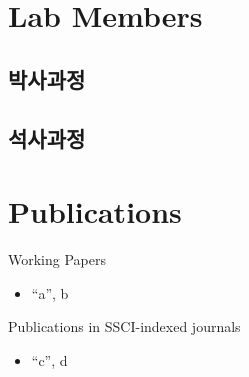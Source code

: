 \documentclass[
]{book}
\providecommand{\tightlist}{%
  \setlength{\itemsep}{0pt}\setlength{\parskip}{0pt}}
\begin{document}
\hypertarget{lab-members}{%
\chapter{Lab Members}\label{lab-members}}

\hypertarget{uxbc15uxc0acuxacfcuxc815}{%
\section{박사과정}\label{uxbc15uxc0acuxacfcuxc815}}

\hypertarget{uxc11duxc0acuxacfcuxc815}{%
\section{석사과정}\label{uxc11duxc0acuxacfcuxc815}}

\hypertarget{publications}{%
\chapter{Publications}\label{publications}}

Working Papers

\begin{itemize}
\tightlist
\item
  ``a'', b
\end{itemize}

Publications in SSCI-indexed journals

\begin{itemize}
\tightlist
\item
  ``c'', d
\end{itemize}

  
\end{document}
